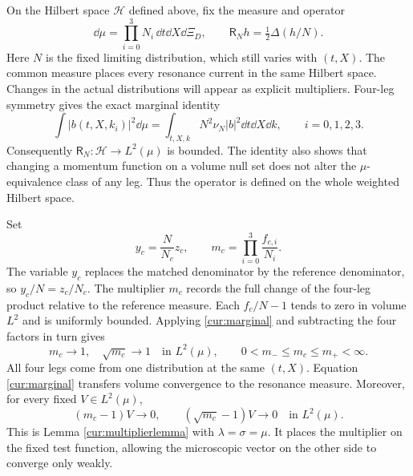 On the Hilbert space $\mathcal H$ defined above, fix the measure and operator
\begin{equation}\label{cur:jointmeasure}
 \dd\mu=\prod_{i=0}^3N_i\,\dd t\dd X\dd\Xi_D,
      \qquad \mathsf R_Nh=\tfrac12\Delta(h/N).
\end{equation}
Here $N$ is the fixed limiting distribution, which still varies with
$(t,X)$. The common measure places every resonance current in the
same Hilbert space. Changes in the actual distributions will appear
as explicit multipliers. Four-leg symmetry gives the exact marginal
identity
\begin{equation}\label{cur:marginal}
 \int|b(t,X,k_i)|^2\dd\mu
     =\int_{t,X,k}N^2\nu_N|b|^2\dd t\dd X\dd k,
                   \qquad i=0,1,2,3.
\end{equation}
Consequently $\mathsf R_N:\mathcal H\to L^2(\mu)$ is bounded.
The identity also shows that changing a momentum function on a volume
null set does not alter the $\mu$-equivalence class of any leg.
Thus the operator is defined on the whole weighted Hilbert space.

Set
\begin{equation}\label{cur:multipliers}
 y_c=\frac N{N_c}z_c,\qquad
 m_c=\prod_{i=0}^3\frac{f_{c,i}}{N_i}.
\end{equation}
The variable $y_c$ replaces the matched denominator by the reference
denominator, so $y_c/N=z_c/N_c$. The multiplier $m_c$ records the full
change of the four-leg product relative to the reference measure.
Each $f_c/N-1$ tends to zero in volume $L^2$ and is uniformly bounded.
Applying \eqref{cur:marginal} and subtracting the four factors in turn gives
\begin{equation}\label{cur:coefficientconvergence}
 m_c\to1,\quad \sqrt{m_c}\to1\quad\text{in }L^2(\mu),
          \qquad 0<m_-\le m_c\le m_+<\infty.
\end{equation}
All four legs come from one distribution at the same $(t,X)$.
Equation \eqref{cur:marginal} transfers volume convergence to the
resonance measure. Moreover, for every fixed $V\in L^2(\mu)$,
\begin{equation}\label{cur:fixedmultiplier}
 (m_c-1)V\to0,\qquad(\sqrt{m_c}-1)V\to0
                         \quad\text{in }L^2(\mu).
\end{equation}
This is Lemma \ref{cur:multiplierlemma} with $\lambda=\sigma=\mu$.
It places the multiplier on the fixed test function, allowing the
microscopic vector on the other side to converge only weakly.

